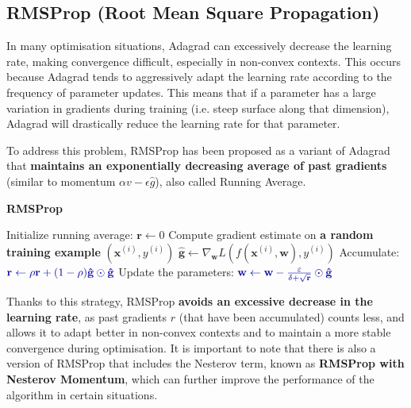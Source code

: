 \subsection{RMSProp (Root Mean Square Propagation)}

In many optimisation situations, Adagrad can excessively decrease the learning rate, making convergence difficult, especially in non-convex contexts. This occurs because Adagrad tends to aggressively adapt the learning rate according to the frequency of parameter updates. This means that if a parameter has a large variation in gradients during training (i.e. steep surface along that dimension), Adagrad will drastically reduce the learning rate for that parameter.

To address this problem, RMSProp has been proposed as a variant of Adagrad that \textbf{maintains an exponentially decreasing average of past gradients} (similar to momentum $\alpha v -\epsilon\hat{g}$), also called Running Average.

\begin{algorithm}
\renewcommand\thealgorithm{}
\caption{\textbf{\textcolor{mygreen}{RMSProp}}}
\begin{algorithmic}[1]
\STATE Initialize running average: $\mathbf{r} \leftarrow 0$
\STATE Compute gradient estimate on \textbf{\textcolor{myred}{a random training example}} $(\mathbf{x}^{(i)}, y^{(i)})$
\STATE $\mathbf{\hat{g}} \leftarrow \nabla_{\mathbf{w}} L(f(\mathbf{x}^{(i)},\mathbf{w}), y^{(i)})$
\STATE Accumulate:
$\textcolor{mybluee}{\mathbf{r} \leftarrow \rho \mathbf{r} + (1 - \rho) \mathbf{\hat{g}} \odot \mathbf{\hat{g}}}$
\STATE Update the parameters:
$\textcolor{mybluee}{\mathbf{w} \leftarrow \mathbf{w} - \frac{\varepsilon}{\delta + \sqrt{\mathbf{r}}} \odot \mathbf{\hat{g}}}$
\ENDWHILE
\end{algorithmic}
\end{algorithm}

Thanks to this strategy, RMSProp \textbf{avoids an excessive decrease in the learning rate}, as past gradients $r$ (that have been accumulated) counts less, and allows it to adapt better in non-convex contexts and to maintain a more stable convergence during optimisation. It is important to note that there is also a version of RMSProp that includes the Nesterov term, known as \textbf{RMSProp with Nesterov Momentum}, which can further improve the performance of the algorithm in certain situations.


